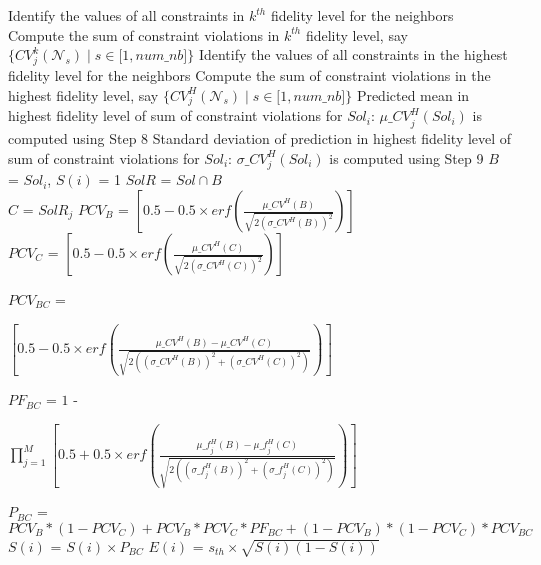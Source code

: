 \begin{minipage}[0.9\textheight]{0.95\columnwidth}
\begin{spacing}{0.7}
\begin{algorithm}[H]
\begin{algorithmic}[1]
				\STATE Identify the values of all constraints in $k^{th}$ fidelity level for the neighbors
				\STATE Compute the sum of constraint violations in $k^{th}$ fidelity level, say $\{{CV}^k_j (\mathcal{N}_s)\mid s\in\lbrack 1,num\_nb\rbrack\}$
				\STATE Identify the values of all constraints in the highest fidelity level for the neighbors
				\STATE Compute the sum of constraint violations in the highest fidelity level, say $\{{CV}^H_j (\mathcal{N}_s)\mid s\in\lbrack 1,num\_nb\rbrack\}$	
				\STATE Predicted mean in highest fidelity level of sum of constraint violations for $Sol_i$: ${\mu\_{CV}}^H_j (Sol_i)$ is computed using Step 8
				\STATE Standard deviation of prediction in highest fidelity level of sum of constraint violations for $Sol_i$: ${\sigma\_{CV}}^H_j (Sol_i)$ is computed using Step 9
				\ENDIF
				\ENDFOR
				\ENDFOR
				\STATE $B$ = $Sol_i$, $S(i)$ = 1
				\STATE $SolR$ = $Sol\cap B$ \qquad {} \\
				\STATE $C$ = $SolR_j$
				\STATE $PCV_B$ = $\left[0.5 - 0.5\times erf\left(\frac{{\mu\_{CV}}^H (B)}{\sqrt{2\left({\sigma\_{CV}}^H (B)\right)^2}}\right)\right]$ \qquad {}\\
				\STATE $PCV_C$ = $\left[0.5 - 0.5\times erf\left(\frac{{\mu\_{CV}}^H (C)}{\sqrt{2\left({\sigma\_{CV}}^H (C)\right)^2}}\right)\right]$ \qquad {}\\
				\STATE \begin{varwidth}[t]{\linewidth}$PCV_{BC}$ = \par $\left[0.5 - 0.5\times erf\left(\frac{{\mu\_{CV}}^H (B) - {\mu\_{CV}}^H (C)}{\sqrt{2\left(\left({\sigma\_{CV}}^H (B)\right)^2 + \left({\sigma\_{CV}}^H (C)\right)^2\right)}}\right)\right]$\end{varwidth} \qquad {}
				\STATE \begin{varwidth}[t]{\linewidth}$PF_{BC}$ = $1$ - \par$\prod_{j = 1}^M \left[0.5 + 0.5\times erf\left(\frac{{\mu\_f}^H_j (B) - {\mu\_f}^H_j (C)}{\sqrt{2\left(\left({\sigma\_f}^H_j (B)\right)^2 + \left({\sigma\_f}^H_j (C)\right)^2\right)}}\right)\right]$\end{varwidth} \qquad {}
				\STATE $P_{BC}$ = $PCV_{B}*(1-PCV_{C}) + PCV_{B}*PCV_{C}*PF_{BC} + (1-PCV_{B})*(1-PCV_{C})*PCV_{BC}$ \qquad {}
				\STATE $S (i)$ = $S (i)\times P_{BC}$
				\ENDFOR
				\STATE $E (i)$ = $s_{th}\times\sqrt{S (i)(1 - S (i))}$
				\ENDFOR	    
			\end{algorithmic}
			\label{alg:findscore}
		\end{algorithm}
	\end{spacing}
\end{minipage}

